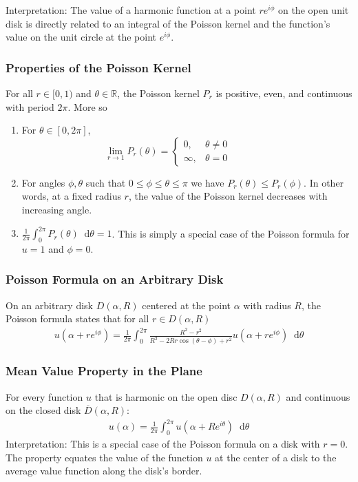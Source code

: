 \documentclass[11pt, a4paper]{article}
\newcommand{\diff}{\mathop{}\!\mathrm{d}} %
\newcommand{\R}{\mathbb{R}} %
\begin{document}
Interpretation: The value of a harmonic function at a point $ re^{i\phi} $ on the open unit disk is directly related to an integral of the Poisson kernel and the function's value on the unit circle at the point $ e^{i\phi} $.

\subsubsection{Properties of the Poisson Kernel}
For all $ r\in[0, 1) $ and $ \theta \in \R $, the Poisson kernel $ P_r $ is positive, even, and continuous with period $ 2\pi $. More so
\begin{enumerate}
	\item For $ \theta \in [0, 2\pi] $,
	 \[ \lim_{r\to1}P_r(\theta) = 
	 \begin{cases}
		0, & \theta \neq 0\\
		\infty, & \theta = 0	
	\end{cases} \qquad \qquad 	 
	\]

	\item For angles $ \phi, \theta $ such that $ 0 \leq \phi \leq \theta \leq \pi $ we have $ P_r(\theta) \leq P_r(\phi) $. In other words, at a fixed radius $ r $, the value of the Poisson kernel decreases with increasing angle.
	
	\item $ \displaystyle{\frac{1}{2\pi} \int_{0}^{2\pi} P_r(\theta)\diff \theta = 1} $. This is simply a special case of the Poisson formula for $ u = 1 $ and $ \phi = 0 $.
\end{enumerate}


\subsubsection{Poisson Formula on an Arbitrary Disk}
On an arbitrary disk $ D(\alpha, R) $ centered at the point $ \alpha $ with radius $ R $, the Poisson formula states that for all $ r \in D(\alpha, R) $
\begin{align*}
	u(\alpha + re^{i\phi}) = \frac{1}{2\pi} \int_{0}^{2\pi} \frac{R^2 - r^2}{R^2 - 2 Rr \cos(\theta - \phi) + r^2} u(\alpha + re^{i\phi}) \diff \theta
\end{align*}

\subsubsection{Mean Value Property in the Plane}
For every function $ u $ that is harmonic on the open disc $ D(\alpha, R) $ and continuous on the closed disk $ \overline{D}(\alpha, R) $:
\begin{align*}
	u(\alpha) = \frac{1}{2\pi}\int_{0}^{2\pi}u(\alpha + Re^{i\theta}) \diff \theta
\end{align*}
Interpretation: This is a special case of the Poisson formula on a disk with $ r = 0 $. The property equates the value of the function $ u $ at the center of a disk to the average value function along the disk's border.
\end{document}
